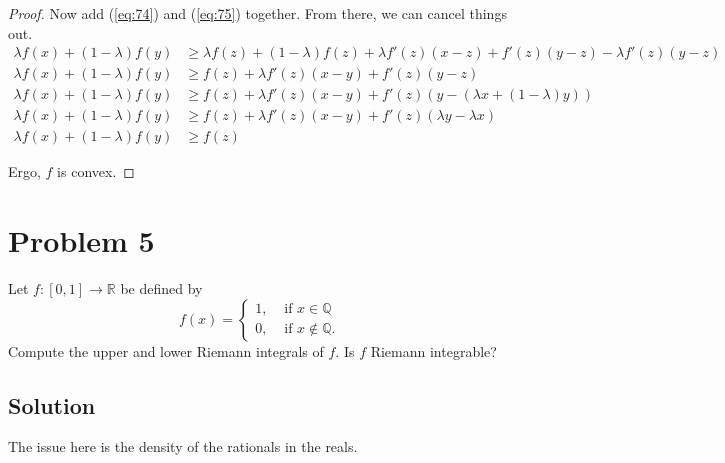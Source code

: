 \documentclass[11pt]{article}
\begin{document}
\begin{proof}
            Now add (\ref{eq:74}) and (\ref{eq:75}) together.
            From there, we can cancel things out.
            \begin{align}
                \lambda f(x) + (1 - \lambda) f(y)   &\geq   \lambda f(z) + (1 - \lambda) f(z) + \lambda f'(z) (x - z) + f'(z) (y - z) - \lambda f'(z) (y - z)\\
                \lambda f(x) + (1 - \lambda) f(y)   &\geq   f(z) + \lambda f'(z) (x - y) + f'(z) (y - z)\\
                \lambda f(x) + (1 - \lambda) f(y)   &\geq   f(z) + \lambda f'(z) (x - y) + f'(z) (y - (\lambda x + (1 - \lambda)y))\\
                \lambda f(x) + (1 - \lambda) f(y)   &\geq   f(z) + \lambda f'(z) (x - y) + f'(z) (\lambda y - \lambda x)\\
                \lambda f(x) + (1 - \lambda) f(y)   &\geq   f(z)
            \end{align}

            Ergo, $f$ is convex.
        \end{proof}

\pagebreak
\section{Problem 5}
    Let $f : [0, 1] \to \mathbb{R}$ be defined by
    \begin{equation*}
        f(x) = 
        \begin{cases}
            1, & \text{ if } x \in \mathbb{Q}\\
            0, & \text{ if } x \notin \mathbb{Q}.
        \end{cases}
    \end{equation*}
    Compute the upper and lower Riemann integrals of $f$. Is $f$ Riemann integrable?

    \subsection{Solution}
        The issue here is the density of the rationals in the reals.
\end{document}
